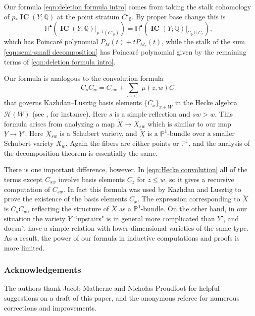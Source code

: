 \documentclass[12pt,reqno]{amsart}
\theoremstyle{definition}
\theoremstyle{remark}
\newcommand{\crk}{\operatorname{crk}}
\renewcommand{\dim}{\operatorname{dim}}
\newcommand{\Q}{{\mathbb{Q}}}
\newcommand{\IC}{\mathop{\mathbf{IC}}}
\renewcommand{\(}{\left(}
\renewcommand{\)}{\right)}
\newcommand{\<}{\left<}
\renewcommand{\>}{\right>}
\begin{document}

Our formula \eqref{eqn:deletion formula intro} comes from taking the stalk cohomology of $p_*\IC(Y; \Q)$ at the point stratum $C'_{\emptyset}$.  By proper base change this is
\[\mathbb H^\bullet(\IC(Y;\Q)|_{p^{-1}(C'_\emptyset)}) =\mathbb H^\bullet(\IC(Y;\Q)|_{C_\emptyset \cup C_e}),\]
which has Poincar\'e polynomial $P_M(t) + tP_{M_e}(t)$, while  the stalk of the sum \eqref{eqn:semi-small decomposition}
has Poincar\'e polynomial given by the remaining terms of \eqref{eqn:deletion formula intro}.

Our formula is analogous to the convolution formula
\begin{equation}\label{eqn:Hecke convolution}
C_sC_w = C_{sw} + \sum_{sz < z} \mu(z,w)C_z
\end{equation}
that governs Kazhdan--Lusztig basis elements $\{C_x\}_{x\in W}$ in the Hecke algebra $\mathcal H(W)$ (see \cite[equation (22)]{H}, for instance).  Here $s$ is a simple reflection and $sw > w$.  This formula arises from analyzing a map $\widetilde{X} \to X_{sw}$ which is similar to our map $Y \to Y'$.  Here $X_{sw}$ is a Schubert variety, and $\widetilde{X}$ is a $\mathbb P^1$-bundle over a smaller Schubert variety $X_w$. Again the fibers are either points or $\mathbb P^1$, and the analysis of the decomposition theorem is essentially the same.

There is one important difference, however.  In \eqref{eqn:Hecke convolution} all of the terms except $C_{sw}$ involve basis elements $C_z$  for $z \le w$, so it gives a recursive computation of $C_{sw}$.  In fact this formula was used by Kazhdan and Lusztig \cite{KL} to prove the existence of the basis elements $C_x$.  The expression corresponding to $\widetilde{X}$ is $C_sC_w$, reflecting the structure of $\widetilde{X}$ as a $\mathbb P^1$-bundle.  On the other hand, in our situation the variety $Y$ ``upstairs" is in general more complicated than $Y'$, and doesn't have a simple relation with lower-dimensional varieties of the same type.
As a result, the power of our formula in inductive computations and proofs is  more limited.

\subsubsection*{Acknowledgements}
The authors thank Jacob Matherne and Nicholas Proudfoot for helpful suggestions on a draft of this paper, and the anonymous referee for numerous corrections and improvements.
\end{document}
